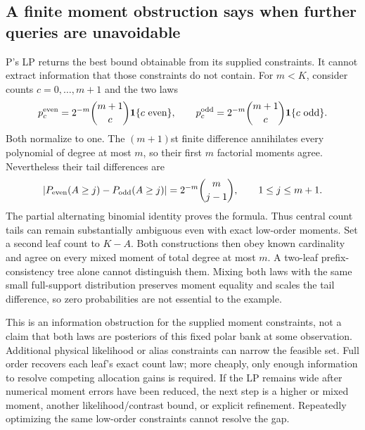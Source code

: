 \documentclass[10pt,a4paper]{article}
\newcommand{\ind}{\mathbf 1}
\begin{document}
\subsection{A finite moment obstruction says when further queries are unavoidable}
P's LP returns the best bound obtainable from its supplied constraints. It cannot extract information
that those constraints do not contain. For $m<K$, consider counts $c=0,\ldots,m+1$ and the two laws
\[
 p_c^{\rm even}=2^{-m}\binom{m+1}{c}\ind\{c\text{ even}\},\qquad
 p_c^{\rm odd}=2^{-m}\binom{m+1}{c}\ind\{c\text{ odd}\}.
\]
Both normalize to one. The $(m+1)$st finite difference annihilates every polynomial of degree at most
$m$, so their first $m$ factorial moments agree. Nevertheless their tail differences are
\begin{equation}
 \left|P_{\rm even}(A\geq j)-P_{\rm odd}(A\geq j)\right|
 =2^{-m}\binom m{j-1},\qquad 1\leq j\leq m+1.
 \label{eq:moment-information-obstruction}
\end{equation}
The partial alternating binomial identity proves the formula. Thus central count tails can remain
substantially ambiguous even with exact low-order moments.
Set a second leaf count to $K-A$. Both constructions then obey known cardinality and agree on every
mixed moment of total degree at most $m$. A two-leaf prefix-consistency tree alone cannot distinguish them.
Mixing both laws with the same small full-support distribution preserves moment equality and scales
the tail difference, so zero probabilities are not essential to the example.

This is an information obstruction for the supplied moment constraints, not a claim that both laws are
posteriors of this fixed polar bank at some observation. Additional physical likelihood or alias
constraints can narrow the feasible set. Full order recovers each leaf's exact count law; more cheaply,
only enough information to resolve competing allocation gains is required.
If the LP remains wide after numerical moment errors have been reduced, the next step is a higher or
mixed moment, another likelihood/contrast bound, or explicit refinement. Repeatedly optimizing the same
low-order constraints cannot resolve the gap.
\end{document}
